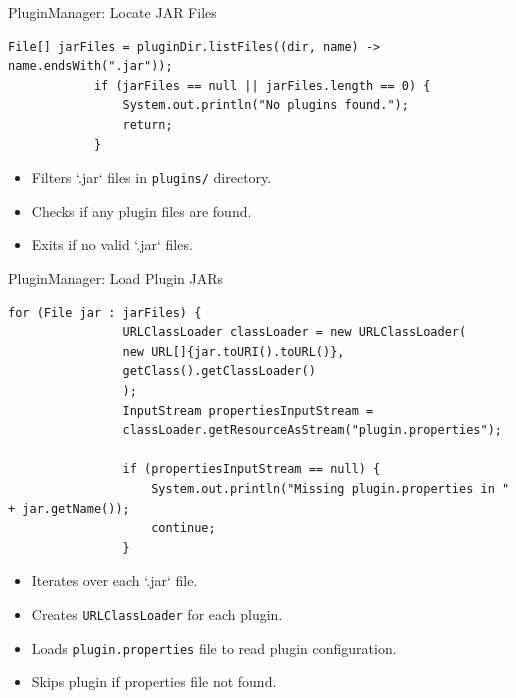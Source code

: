 \documentclass[aspectratio=169, table]{beamer}
\begin{document}
	\begin{frame}[fragile]{PluginManager: Locate JAR Files}
		\vspace{20pt}
		\begin{lstlisting}[style=JavaStyle, inputencoding=utf8, basicstyle=\scriptsize\ttfamily]
			File[] jarFiles = pluginDir.listFiles((dir, name) -> name.endsWith(".jar"));
			if (jarFiles == null || jarFiles.length == 0) {
				System.out.println("No plugins found.");
				return;
			}
		\end{lstlisting}
		
		\begin{itemize}
			\item Filters `.jar` files in \texttt{plugins/} directory.
			\item Checks if any plugin files are found.
			\item Exits if no valid `.jar` files.
		\end{itemize}
	\end{frame}
	
	\begin{frame}[fragile]{PluginManager: Load Plugin JARs}
		\vspace{20pt}
		\begin{lstlisting}[style=JavaStyle, inputencoding=utf8, basicstyle=\tiny\ttfamily]
			for (File jar : jarFiles) {
				URLClassLoader classLoader = new URLClassLoader(
				new URL[]{jar.toURI().toURL()},
				getClass().getClassLoader()
				);
				InputStream propertiesInputStream =
				classLoader.getResourceAsStream("plugin.properties");
				
				if (propertiesInputStream == null) {
					System.out.println("Missing plugin.properties in " + jar.getName());
					continue;
				}
			\end{lstlisting}
			
			\begin{itemize}
				\item Iterates over each `.jar` file.
				\item Creates \texttt{URLClassLoader} for each plugin.
				\item Loads \texttt{plugin.properties} file to read plugin configuration.
				\item Skips plugin if properties file not found.
			\end{itemize}
		\end{frame}
		
\end{document}
